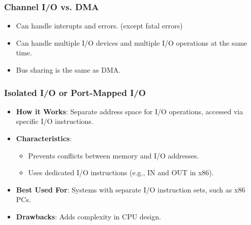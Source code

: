 \begin{frame}
    \frametitle{Channel I/O vs. DMA}
        \begin{itemize}
            \item Can handle interupts and errors. (except fatal errors)
            \item Can handle multiple I/O devices and multiple I/O operations at the same time.
            \item Bus sharing is the same as DMA.
        \end{itemize}
\end{frame}

\begin{frame}
    \frametitle{Isolated I/O or Port-Mapped I/O}
    \begin{itemize}
        \item \textbf{How it Works}: Separate address space for I/O operations, accessed via specific I/O instructions.
        \item \textbf{Characteristics}:
            \begin{itemize}
                \item Prevents conflicts between memory and I/O addresses.
                \item Uses dedicated I/O instructions (e.g., IN and OUT in x86).
            \end{itemize}
        \item \textbf{Best Used For}: Systems with separate I/O instruction sets, such as x86 PCs.
        \item \textbf{Drawbacks}: Adds complexity in CPU design.
    \end{itemize}
\end{frame}

